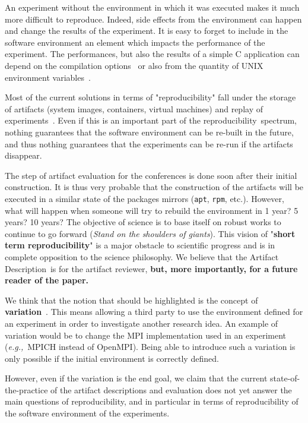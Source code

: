 \documentclass[sigconf,natbib=false]{acmart}
\newcommand{\repro}{reproducibility}
\newcommand{\eg}{\emph{e.g.,}}
\newcommand{\ad}{Artifact Description}
\begin{document}
An experiment without the environment in which it was executed makes it much more difficult to reproduce.
Indeed, side effects from the environment can happen and change the results of the experiment.
It is easy to forget to include in the software environment an element which impacts the performance of the experiment.
The performances, but also the results of a simple C application can depend on the compilation options\ \cite{stodden2018assessing} or also from the quantity of UNIX environment variables\ \cite{mytkowicz2009producing}.

Most of the current solutions in terms of "\repro" fall under the storage of artifacts (system images, containers, virtual machines) and replay of experiments\ \cite{rosendo2020e2clab, brammer2011paper, brinckman2019computing}.
Even if this is an important part of the \repro\ spectrum, nothing guarantees that the software environment can be re-built in the future, and thus nothing guarantees that the experiments can be re-run if the artifacts disappear. 


The step of artifact evaluation for the conferences is done soon after their initial construction.
It is thus very probable that the construction of the artifacts will be executed in a similar state of the packages mirrors (\texttt{apt}, \texttt{rpm}, etc.).
However, what will happen when someone will try to rebuild the environment in 1 year? 5 years? 10 years?
The objective of science is to base itself on robust works to continue to go forward (\emph{Stand on the shoulders of giants}).
This vision of "\textbf{short term reproducibility}" is a major obstacle to scientific progress and is in complete opposition to the science philosophy.
We believe that the \ad\ is for the artifact reviewer, \textbf{but, more importantly, for a future reader of the paper.}


We think that the notion that should be highlighted is the concept of \textbf{variation}\ \cite{mercier2018considering, feitelson_repeatability_2015}.
This means allowing a third party to use the environment defined for an experiment in order to investigate another research idea.
An example of variation would be to change the MPI implementation used in an experiment (\eg\ MPICH instead of OpenMPI).
Being able to introduce such a variation is only possible if the initial environment is correctly defined.

However, even if the variation is the end goal, we claim that the current state-of-the-practice of the artifact descriptions and evaluation does not yet answer the main questions of reproducibility, and in particular in terms of reproducibility of the software environment of the experiments.
\end{document}
